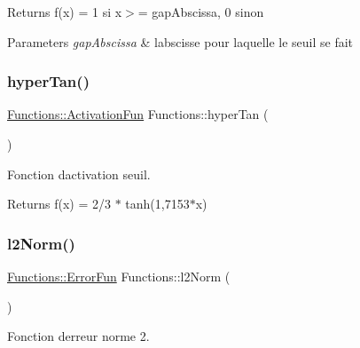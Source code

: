 \begin{DoxyReturn}{Returns}
f(x) = 1 si x$>$= gap\+Abscissa, 0 sinon 
\end{DoxyReturn}

\begin{DoxyParams}{Parameters}
{\em gap\+Abscissa} & l\textquotesingle{}abscisse pour laquelle le seuil se fait \\
\hline
\end{DoxyParams}
\mbox{\label{structFunctions_a0aac84382fccbc38cacccd566434d4a8}} 
\subsubsection{\texorpdfstring{hyper\+Tan()}{hyperTan()}}
{\footnotesize\ttfamily \hyperlink{structFunctions_ad25362ffa52b2f7933431190546593ac}{Functions\+::\+Activation\+Fun} Functions\+::hyper\+Tan (\begin{DoxyParamCaption}{ }\end{DoxyParamCaption})\hspace{0.3cm}{\ttfamily [static]}}



Fonction d\textquotesingle{}activation seuil. 

\begin{DoxyReturn}{Returns}
f(x) = 2/3 $\ast$ tanh(1,7153$\ast$x) 
\end{DoxyReturn}
\mbox{\label{structFunctions_a00bac40f42bb6c47d25c0cd238c4275a}} 
\subsubsection{\texorpdfstring{l2\+Norm()}{l2Norm()}}
{\footnotesize\ttfamily \hyperlink{structFunctions_a834bc4170f1caa8c77272ecf51dbae5c}{Functions\+::\+Error\+Fun} Functions\+::l2\+Norm (\begin{DoxyParamCaption}{ }\end{DoxyParamCaption})\hspace{0.3cm}{\ttfamily [static]}}



Fonction d\textquotesingle{}erreur norme 2. 

\mbox{\label{structFunctions_a773de9cd59f7ccc3e2fe9822f0536ae4}} 
